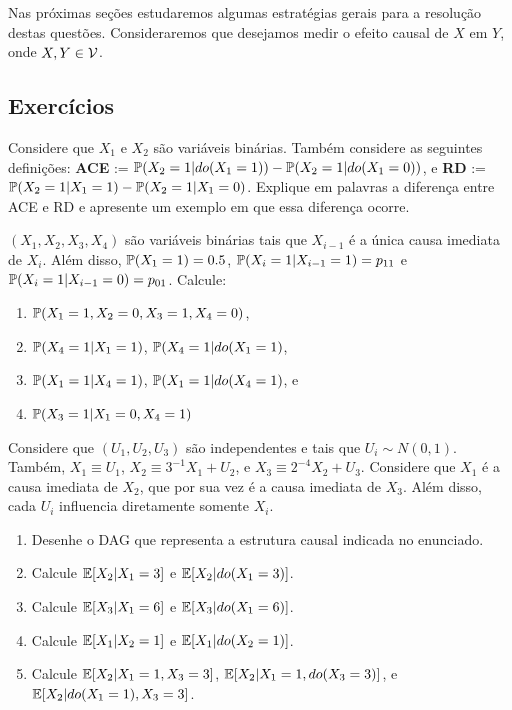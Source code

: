 Nas próximas seções estudaremos 
algumas estratégias gerais para 
a resolução destas questões.
Consideraremos que desejamos medir
o efeito causal de $X$ em $Y$, 
onde $X, Y \in \sV$.

\subsection{Exercícios}

\begin{exercise}
 Considere que $X_1$ e $X_2$ são variáveis binárias.
 Também considere as seguintes definições:
 \textbf{ACE} := $\P(X_2=1|do(X_1=1))-\P(X_2=1|do(X_1=0))$, e
 \textbf{RD} := $\P(X_2=1|X_1=1)-\P(X_2=1|X_1=0)$.
 Explique em palavras a diferença entre ACE e RD e
 apresente um exemplo em que essa diferença ocorre.
\end{exercise}

\begin{exercise}
 $(X_1,X_2,X_3,X_4)$ são 
 variáveis binárias tais que
 $X_{i-1}$ é a única causa imediata de $X_i$.
 Além disso, $\P(X_1=1)=0.5$,
 $\P(X_i=1|X_{i-1}=1)=p_{11}$ e
 $\P(X_i=1|X_{i-1}=0)=p_{01}$.
 Calcule:
 \begin{enumerate}[label=(\alph*)]
  \item $\P(X_1=1,X_2=0,X_3=1,X_4=0)$,
  \item $\P(X_4=1|X_1=1)$, $\P(X_4=1|do(X_1=1)$, 
  \item $\P(X_1=1|X_4=1)$, $\P(X_1=1|do(X_4=1)$, e
  \item $\P(X_3=1|X_1=0,X_4=1)$
 \end{enumerate}
\end{exercise}

\begin{exercise}
 Considere que $(U_1, U_2, U_3)$ são independentes e
 tais que $U_i \sim N(0,1)$. Também,
 $X_1 \equiv U_1$,
 $X_2 \equiv 3^{-1}X_1 + U_2$, e
 $X_3 \equiv 2^{-4}X_2 + U_3$.
 Considere que $X_1$ é 
 a causa imediata de $X_2$,
 que por sua vez é a causa imediata de $X_3$.
 Além disso, cada $U_i$ influencia diretamente somente $X_i$.
 \begin{enumerate}[label=(\alph*)]
  \item Desenhe o DAG que representa 
  a estrutura causal indicada no enunciado. 
  \item Calcule $\E[X_2|X_1 = 3]$ e $\E[X_2|do(X_1 = 3)]$.
  \item Calcule $\E[X_3|X_1 = 6]$ e $\E[X_3|do(X_1 = 6)]$.
  \item Calcule $\E[X_1|X_2 = 1]$ e $\E[X_1|do(X_2 = 1)]$.
  \item Calcule $\E[X_2|X_1 = 1, X_3 = 3]$,
  $\E[X_2|X_1 = 1, do(X_3 = 3)]$, e
  $\E[X_2|do(X_1 = 1), X_3 = 3]$.
 \end{enumerate}
\end{exercise}


